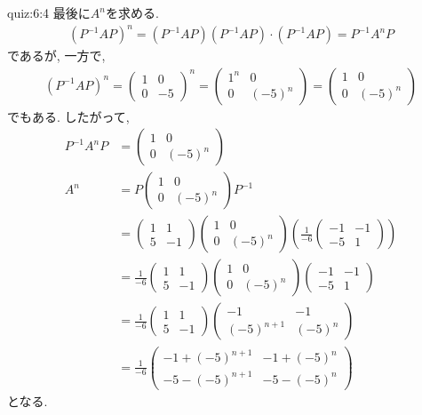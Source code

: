 \begin{answerof}{quiz:6:4}
  最後に$A^n$を求める.
  \begin{align*}
    (P^{-1}AP)^n=(P^{-1}AP)(P^{-1}AP)\cdot (P^{-1}AP)=P^{-1}A^nP
  \end{align*}
  であるが, 一方で,
  \begin{align*}
    (P^{-1}AP)^n=\begin{pmatrix}1&0\\0&-5\end{pmatrix}^n
    =\begin{pmatrix}1^n&0\\0&(-5)^n\end{pmatrix}
    =\begin{pmatrix}1&0\\0&(-5)^n\end{pmatrix}
  \end{align*}
  でもある.
  したがって,
  \begin{align*}
    P^{-1}A^nP&=\begin{pmatrix}1&0\\0&(-5)^n\end{pmatrix}\\
    A^n
    &=P\begin{pmatrix}1&0\\0&(-5)^n\end{pmatrix}P^{-1}\\
    &=\begin{pmatrix}1&1\\5&-1\end{pmatrix}\begin{pmatrix}1&0\\0&(-5)^n\end{pmatrix}(\frac{1}{-6}\begin{pmatrix}-1&-1\\-5&1\end{pmatrix})\\
    &=\frac{1}{-6}\begin{pmatrix}1&1\\5&-1\end{pmatrix}\begin{pmatrix}1&0\\0&(-5)^n\end{pmatrix}\begin{pmatrix}-1&-1\\-5&1\end{pmatrix}\\
    &=\frac{1}{-6}\begin{pmatrix}1&1\\5&-1\end{pmatrix}\begin{pmatrix}-1&-1\\(-5)^{n+1}&(-5)^n\end{pmatrix}\\
    &=\frac{1}{-6}\begin{pmatrix}-1+(-5)^{n+1}&-1+(-5)^n\\-5-(-5)^{n+1}&-5-(-5)^n\end{pmatrix}
  \end{align*}
  となる.
\end{answerof}


